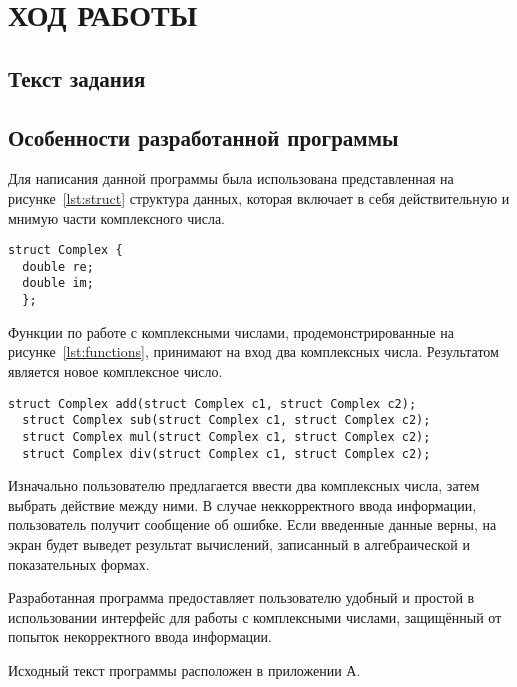 
\section{ХОД РАБОТЫ}

\subsection{Текст задания}



\subsection{Особенности разработанной программы}

Для написания данной программы была использована представленная на рисунке~\ref{lst:struct} структура данных, которая включает в себя действительную и мнимую части комплексного числа. 

\begin{lstlisting}[caption=Структура данных Complex,label=lst:struct]
  struct Complex {
  double re;
  double im;
  };
\end{lstlisting}

Функции по работе с комплексными числами, продемонстрированные на рисунке~\ref{lst:functions}, принимают на вход два комплексных числа. Результатом является новое комплексное число.

\begin{lstlisting}[caption=Функции работы с комплексными числами,label=lst:functions]
  struct Complex add(struct Complex c1, struct Complex c2);
  struct Complex sub(struct Complex c1, struct Complex c2);
  struct Complex mul(struct Complex c1, struct Complex c2);
  struct Complex div(struct Complex c1, struct Complex c2);
\end{lstlisting}

Изначально пользователю предлагается ввести два комплексных числа, затем выбрать действие между ними. В случае неккорректного ввода информации, пользователь получит сообщение об ошибке. Если введенные данные верны, на экран будет выведет результат вычислений, записанный в алгебраической и показательных формах.

Разработанная программа предоставляет пользователю удобный и простой в использовании интерфейс для работы с комплексными числами, защищённый от попыток некорректного ввода информации.

Исходный текст программы расположен в приложении А.

\newpage